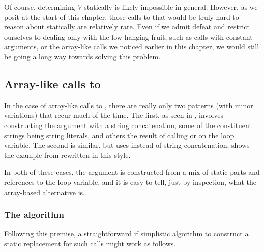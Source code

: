Of course, determining $V$ statically is likely impossible in general. However,
as we posit at the start of this chapter, those calls to  that would
be truly hard to reason about statically are relatively rare. Even if we admit
defeat and restrict ourselves to dealing only with the low-hanging fruit, such
as calls with constant arguments, or the array-like calls we noticed earlier in
this chapter, we would still be going a long way towards solving this problem.

\subsection{Array-like calls to }

In the case of array-like calls to , there are really only two
patterns (with minor variations) that recur much of the time. The first, as
seen in , involves constructing the argument with a
string concatenation, some of the constituent strings being string
literals, and others the result of calling  or  on
the loop variable. The second is similar, but uses  instead of
string concatenation;  shows the example from
 rewritten in this style.



In both of these cases, the argument is constructed from a mix of static parts
and references to the loop variable, and it is easy to tell, just by
inspection, what the array-based alternative is.

\subsubsection{The algorithm}

Following this premise, a straightforward if simplistic algorithm to construct
a static replacement for such calls might work as follows.

